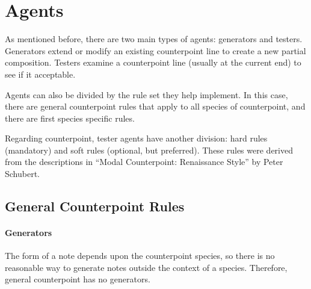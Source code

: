 \section{Agents}

As mentioned before, there are two main types of agents: generators and testers.
Generators extend or modify an existing counterpoint line to create a new partial composition.
Testers examine a counterpoint line (usually at the current end) to see if it acceptable.

%

Agents can also be divided by the rule set they help implement. 
In this case, there are general counterpoint rules that apply to all species of counterpoint, and there are first species specific rules.

Regarding counterpoint, tester agents have another division: hard rules (mandatory) and soft rules (optional, but preferred).
These rules were derived from the descriptions in ``Modal Counterpoint: Renaissance Style'' by Peter Schubert. \cite{ModalCounterpoint} 

\subsection{General Counterpoint Rules}

\paragraph{Generators}
The form of a note depends upon the counterpoint species, so there is no reasonable way to generate notes outside the context of a species.
Therefore, general counterpoint has no generators.

